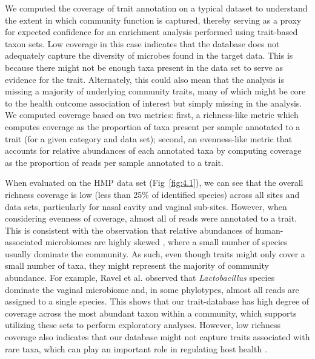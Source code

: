 We computed the coverage of trait annotation on a typical dataset to understand the extent in which community function is captured, thereby serving as a proxy for expected confidence for an enrichment analysis performed using trait-based taxon sets. Low coverage in this case indicates that the database does not adequately capture the diversity of microbes found in the target data. This is because there might not be enough taxa present in the data set to serve as evidence for the trait. Alternately, this could also mean that the analysis is missing a majority of underlying community traits, many of which might be core to the health outcome association of interest but simply missing in the analysis. We computed coverage based on two metrics: first, a richness-like metric which computes coverage as the proportion of taxa present per sample annotated to a trait (for a given category and data set); second, an evenness-like metric that accounts for relative abundances of each annotated taxa by computing coverage as the proportion of reads per sample annotated to a trait.

When evaluated on the HMP data set (Fig~\ref{fig:4.1}), we can see that the overall richness coverage is low (less than 25\% of identified species) across all sites and data sets, particularly for nasal cavity and vaginal sub-sites. However, when considering evenness of coverage, almost all of reads were annotated to a trait. This is consistent with the observation that relative abundances of human-associated microbiomes are highly skewed \cite{consortium2012structure}, where a small number of species usually dominate the community. As such, even though traits might only cover a small number of taxa, they might represent the majority of community abundance. For example, Ravel et al. \cite{ravel2011vaginal} observed that \emph{Lactobacillus} species dominate the vaginal microbiome and, in some phylotypes, almost all reads are assigned to a single species. This shows that our trait-database has high degree of coverage across the most abundant taxon within a community, which supports utilizing these sets to perform exploratory analyses. However, low richness coverage also indicates that our database might not capture traits associated with rare taxa, which can play an important role in regulating host health \cite{velazquez2019endogenous}.

